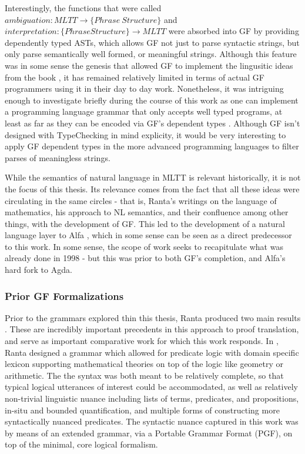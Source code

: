 Interestingly, the functions that were called $ambiguation : MLTT \to \{Phrase\
Structure\}$ and $interpretation : \{Phrase Structure\} \to MLTT$ were absorbed
into GF by providing dependently typed ASTs, which allows GF not just to parse
syntactic strings, but only parse semantically well formed, or meaningful
strings. Although this feature was in some sense the genesis that allowed GF to
implement the lingusitic ideas from the book \cite{rantaTT}, it has remained
relatively limited in terms of actual GF programmers using it in their day to
day work. Nonetheless, it was intriguing enough to investigate briefly during
the course of this work as one can implement a programming language grammar that
only accepts well typed programs, at least as far as they can be encoded via
GF's dependent types \cite{warrickHarper}. Although GF isn't designed with
TypeChecking in mind explicity, it would be very interesting to apply GF
dependent types in the more advanced programming languages to filter parses of
meaningless strings.

While the semantics of natural language in MLTT is relevant historically, it is
not the focus of this thesis. Its relevance comes from the fact that all these
ideas were circulating in the same circles - that is, Ranta's writings on the
language of mathematics, his approach to NL semantics, and their confluence
among other things, with the development of GF. This led to the development of a
natural language layer to Alfa \cite{alfaGF}, which in some sense can be seen as
a direct predecessor to this work. In some sense, the scope of work seeks to
recapitulate what was already done in 1998 - but this was prior to both GF's
completion, and Alfa's hard fork to Agda.

\subsubsection{Prior GF Formalizations}

Prior to the grammars explored thin this thesis, Ranta produced two main results
\cite{rantaLog} \cite{aarneHott}. These are incredibly important precedents in
this approach to proof translation, and serve as important comparative work for
which this work responds. In \cite{rantaLog}, Ranta designed a grammar which
allowed for predicate logic with domain specific lexicon supporting mathematical
theories on top of the logic like geometry or arithmetic. The the syntax was
both meant to be relatively complete, so that typical logical utterances of
interest could be accommodated, as well as relatively non-trivial linguistic
nuance including lists of terms, predicates, and propositions, in-situ and
bounded quantification, and multiple forms of constructing more syntactically
nuanced predicates. The syntactic nuance captured in this work was by means of an
extended grammar, via a Portable Grammar Format (PGF), on top of the minimal,
core logical formalism.

